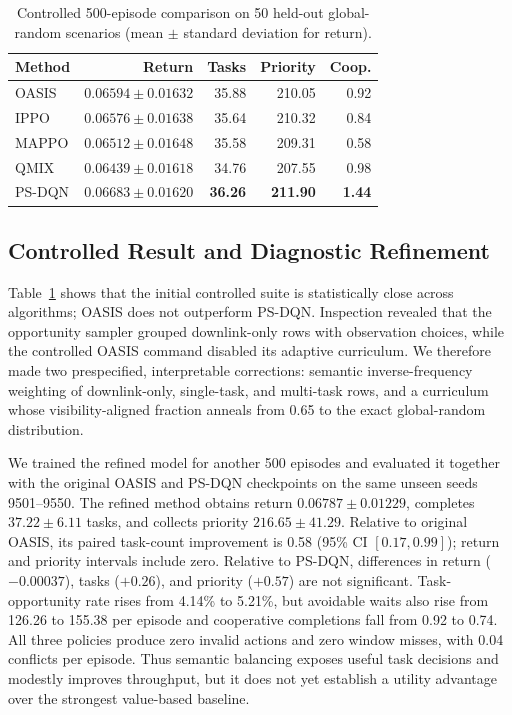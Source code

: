 \documentclass[letterpaper]{article}
\begin{document}
\begin{table}[t]
\centering
\small
\caption{Controlled 500-episode comparison on 50 held-out global-random scenarios (mean $\pm$ standard deviation for return).}
\label{tab:main}
\begin{tabular}{lrrrr}
\toprule
Method & Return & Tasks & Priority & Coop. \\
\midrule
OASIS & $0.06594\pm0.01632$ & 35.88 & 210.05 & 0.92 \\
IPPO & $0.06576\pm0.01638$ & 35.64 & 210.32 & 0.84 \\
MAPPO & $0.06512\pm0.01648$ & 35.58 & 209.31 & 0.58 \\
QMIX & $0.06439\pm0.01618$ & 34.76 & 207.55 & 0.98 \\
PS-DQN & $\mathbf{0.06683\pm0.01620}$ & \textbf{36.26} & \textbf{211.90} & \textbf{1.44} \\
\bottomrule
\end{tabular}
\end{table}

\subsection{Controlled Result and Diagnostic Refinement}

Table~\ref{tab:main} shows that the initial controlled suite is statistically close across algorithms; OASIS does not outperform PS-DQN.  Inspection revealed that the opportunity sampler grouped downlink-only rows with observation choices, while the controlled OASIS command disabled its adaptive curriculum.  We therefore made two prespecified, interpretable corrections: semantic inverse-frequency weighting of downlink-only, single-task, and multi-task rows, and a curriculum whose visibility-aligned fraction anneals from 0.65 to the exact global-random distribution.

We trained the refined model for another 500 episodes and evaluated it together with the original OASIS and PS-DQN checkpoints on the same unseen seeds 9501--9550.  The refined method obtains return $0.06787\pm0.01229$, completes $37.22\pm6.11$ tasks, and collects priority $216.65\pm41.29$.  Relative to original OASIS, its paired task-count improvement is 0.58 (95\% CI $[0.17,0.99]$); return and priority intervals include zero.  Relative to PS-DQN, differences in return ($-0.00037$), tasks ($+0.26$), and priority ($+0.57$) are not significant.  Task-opportunity rate rises from 4.14\% to 5.21\%, but avoidable waits also rise from 126.26 to 155.38 per episode and cooperative completions fall from 0.92 to 0.74.  All three policies produce zero invalid actions and zero window misses, with 0.04 conflicts per episode.  Thus semantic balancing exposes useful task decisions and modestly improves throughput, but it does not yet establish a utility advantage over the strongest value-based baseline.
\end{document}
